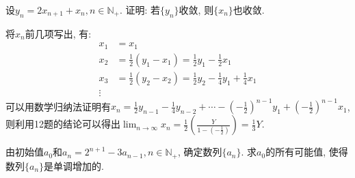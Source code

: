      \begin{exercise}
         设$y_n=2x_{n+1}+x_n, n\in \mathbb{N}_+$. 证明: 若$\{y_n\}$收敛, 则$\{x_n\}$也收敛.
     \end{exercise}
     \begin{solution}
         将$x_n$前几项写出, 有:
         \begin{align*}
             x_1&=x_1 \\
             x_2&=\frac{1}{2}(y_1-x_1)=\frac{1}{2}y_1-\frac{1}{2}x_1 \\
             x_3&=\frac{1}{2}(y_2-x_2)=\frac{1}{2}y_2-\frac{1}{4}y_1+\frac{1}{4}x_1 \\
             \vdots
         \end{align*}
         可以用数学归纳法证明有$x_n=\frac{1}{2}y_{n-1}-\frac{1}{4}y_{n-2}+\cdots-(-\frac{1}{2})^{n-1}y_1+(-\frac{1}{2})^{n-1}x_1$,则利用12题的结论可以得出$\lim_{n\to\infty}x_n=\frac{1}{2}(\frac{Y}{1-(-\frac{1}{2})})=\frac{1}{3}Y$.
     \end{solution}

     \begin{exercise}
         由初始值$a_0$和$a_n=2^{n+1}-3a_{n-1}, n \in \mathbb{N}_+$, 确定数列$\{a_n\}$. 求$a_0$的所有可能值, 使得数列$\{a_n\}$是单调增加的.
     \end{exercise}
